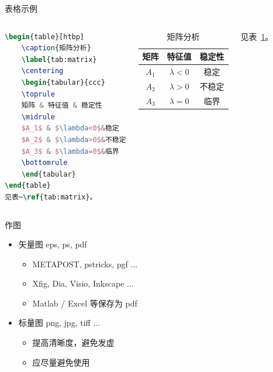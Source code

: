 \documentclass{beamer}  %
\begin{document}
\begin{frame}[fragile]{表格示例}
    \begin{columns}
\begin{lstlisting}[language=TeX]
\begin{table}[htbp]
    \caption{矩阵分析}
    \label{tab:matrix}
    \centering
    \begin{tabular}{ccc}
    \toprule
    矩阵 & 特征值 & 稳定性
    \midrule
    $A_1$ & $\lambda<0$&稳定
    $A_2$ & $\lambda>0$&不稳定
    $A_3$ & $\lambda=0$&临界
    \bottomrule
    \end{tabular}
\end{table}
见表~\ref{tab:matrix}。
\end{lstlisting}
        \begin{table}[htpb]
            \centering
            \caption{矩阵分析}
            \label{tab:matrix}
            \begin{tabular}{@{}ccc@{}}
                \toprule
                矩阵 & 特征值 & 稳定性 \\
                \midrule
                $A_1$ & $\lambda < 0$ & 稳定 \\
                $A_2$ & $\lambda > 0$ & 不稳定 \\
                $A_3$ & $\lambda = 0$ & 临界 \\
                \bottomrule
            \end{tabular}
        \end{table}
        \small 见表~\ref{tab:matrix}。
    \end{columns}
\end{frame}

\begin{frame}{作图}
    \begin{itemize}
        \item 矢量图 eps, ps, pdf
        \begin{itemize}
            \item METAPOST, pstricks, pgf $\ldots$
            \item Xfig, Dia, Visio, Inkscape $\ldots$
            \item Matlab / Excel 等保存为 pdf
        \end{itemize}
        \item 标量图 png, jpg, tiff $\ldots$
        \begin{itemize}
            \item 提高清晰度，避免发虚
            \item 应尽量避免使用
        \end{itemize}
    \end{itemize}
\end{frame}
\end{document}

